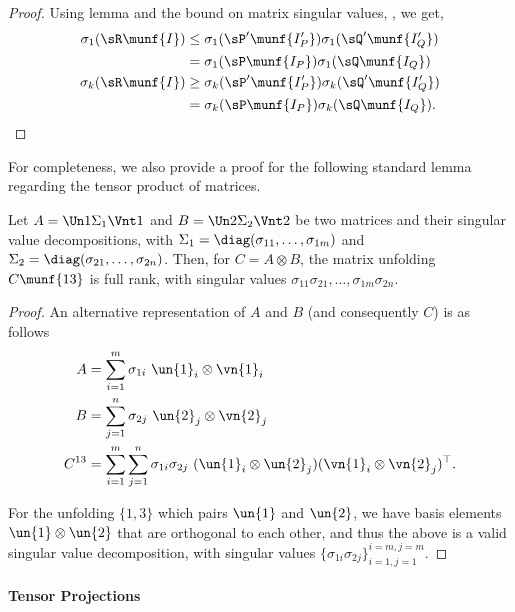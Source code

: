 \begin{proof}
Using lemma  and the bound on matrix singular
values, , we get,
\begin{align*}
\sigma_{1}(\sR\munf{I}) 
    &\le \sigma_{1}({\sP'}\munf{I'_P}) \sigma_{1}({\sQ'}\munf{I'_Q}) \\
      &= \sigma_{1}(\sP\munf{I_P}) \sigma_{1}(\sQ\munf{I_Q}) \\
    \sigma_{k}(\sR\munf{I})  
    &\ge \sigma_{k}({\sP'}\munf{I'_P}) \sigma_{k}({\sQ'}\munf{I'_Q}) \\
      &= \sigma_{k}(\sP\munf{I_P}) \sigma_{k}(\sQ\munf{I_Q}).
\end{align*}
\end{proof}

For completeness, we also provide a proof for the following standard
lemma regarding the tensor product of matrices.

\begin{lemma}
  \label{lem:tensor-prod}
  Let $A = \Un1 \Sigma_1 \Vnt1$ and $B = \Un2 \Sigma_2 \Vnt2$ be two
  matrices and their singular value decompositions, 
  with $\Sigma_1 = \diag(\sigma_{11}, \ldots, \sigma_{1m})$ and $\Sigma_2
  = \diag(\sigma_{21}, \ldots, \sigma_{2n})$. 
  Then, for $C = A \otimes B$, the matrix unfolding $C\munf{13}$ is full
  rank, with singular values $\sigma_{11} \sigma_{21}, \ldots, \sigma_{1m}
  \sigma_{2n}$.
\end{lemma}
\begin{proof}
  An alternative representation of $A$ and $B$ (and consequently $C$) is as follows
  \begin{align*}
    A &= \sum_{i=1}^m \sigma_{1i}~ \un{1}_i \otimes \vn{1}_i \\
    B &= \sum_{j=1}^n \sigma_{2j}~ \un{2}_j \otimes \vn{2}_j \\
    C^{13} &= \sum_{i=1}^m \sum_{j=1}^n \sigma_{1i} \sigma_{2j}~ (\un{1}_i \otimes \un{2}_j)(\vn{1}_i \otimes \vn{2}_j)^\top.
  \end{align*}

  For the unfolding $\{1,3\}$ which pairs $\un{1}$ and $\un{2}$, we have
basis elements $\un{1} \otimes \un{2}$ that are orthogonal to each
other, and thus the above is a valid singular value decomposition,
with singular values $\{ \sigma_{1i} \sigma_{2j} \}_{i=1,j=1}^{i=m,j=m}$. 
\end{proof}

\paragraph{Tensor Projections}

